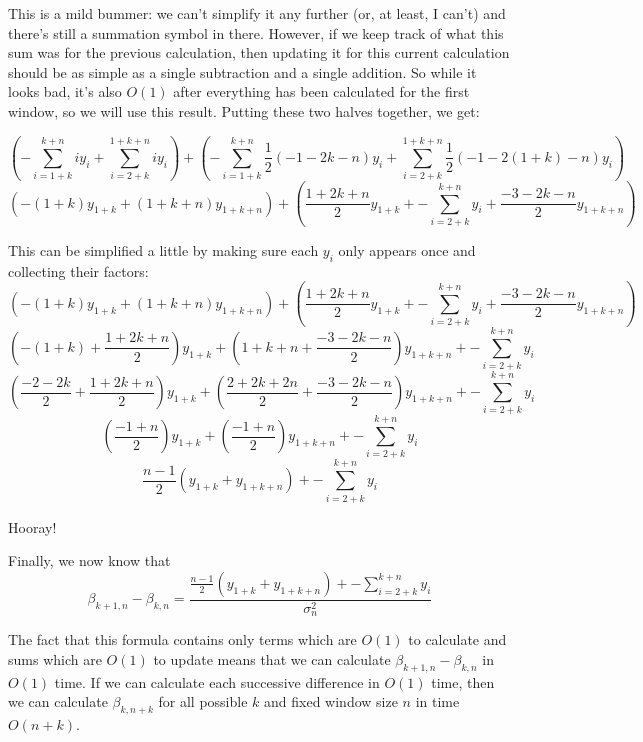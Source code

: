 \documentclass{article}
\begin{document}
This is a mild bummer: we can't simplify it any further (or, at least, I can't) and there's still a summation symbol in there.  However, if we keep track of what this sum was for the previous calculation, then updating it for this current calculation should be as simple as a single subtraction and a single addition. So while it looks bad, it's also $O(1)$ after everything has been calculated for the first window, so we will use this result.  Putting these two halves together, we get:


\[\left(-\sum _{i=1+k}^{k+n} i y_i+\sum _{i=2+k}^{1+k+n} i y_i\right)+\left(-\sum _{i=1+k}^{k+n} \frac{1}{2} (-1-2 k-n) y_i+\sum _{i=2+k}^{1+k+n} \frac{1}{2}(-1-2 (1+k)-n) y_i\right)\]
\[\left(-(1+k)y_{1+k}+ (1+k+n)y_{1+k+n} \right)+\left(\frac{1+2 k+n}{2}y_{1+k} + -\sum _{i=2+k}^{k+n}  y_i + \frac{-3 -2k-n}{2}y_{1+k+n}\right)\]

This can be simplified a little by making sure each $y_i$ only appears once and collecting their factors:
\[\left(-(1+k)y_{1+k}+ (1+k+n)y_{1+k+n} \right)+\left(\frac{1+2 k+n}{2}y_{1+k} + -\sum _{i=2+k}^{k+n}  y_i + \frac{-3 -2k-n}{2}y_{1+k+n}\right)\]
\[\left(-(1+k)+\frac{1+2 k+n}{2}\right)y_{1+k}+ \left(1+k+n+ \frac{-3 -2k-n}{2}\right)y_{1+k+n}+ -\sum _{i=2+k}^{k+n}  y_i\]
\[\left(\frac{-2-2k}{2}+\frac{1+2 k+n}{2}\right)y_{1+k}+ \left(\frac{2+2k+2n}{2}+ \frac{-3 -2k-n}{2}\right)y_{1+k+n} + -\sum _{i=2+k}^{k+n}  y_i\]
\[\left(\frac{-1+n}{2}\right)y_{1+k}+ \left(\frac{-1+n}{2}\right)y_{1+k+n} + -\sum _{i=2+k}^{k+n}  y_i\]
\[\frac{n-1}{2}\left(y_{1+k}+ y_{1+k+n}\right) + -\sum _{i=2+k}^{k+n}  y_i\]

Hooray!

Finally, we now know that 
\[\beta_{k+1,n} - \beta_{k,n} = \frac{\frac{n-1}{2}\left(y_{1+k}+ y_{1+k+n}\right) + -\sum _{i=2+k}^{k+n}  y_i}{\sigma^2_n}\]

The fact that this formula contains only terms which are $O(1)$ to calculate and sums which are $O(1)$ to update means that we can calculate $\beta_{k+1,n} - \beta_{k,n}$ in $O(1)$ time. If we can calculate each successive difference in $O(1)$ time, then we can calculate $\beta_{k,n+k}$ for all possible $k$ and fixed window size $n$ in time $O(n+k)$.
\end{document}
